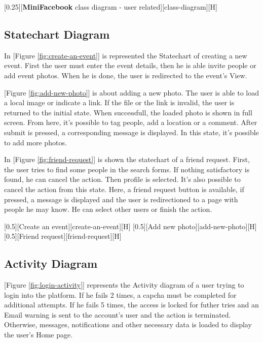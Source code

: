 \documentclass{article}
\begin{document}
			[0.25][\textbf{MiniFacebook} class diagram - user related][class-diagram][H]

		\subsection{Statechart Diagram}
			In [Figure \ref{fig:create-an-event}] is represented the Statechart of creating a new event. First the user must enter the event details, then he is able invite people or add event photos. When he is done, the user is redirected to the event's View.

			\bigskip
			[Figure \ref{fig:add-new-photo}] is about adding a new photo. The user is able to load a local image or indicate a link. If the file or the link is invalid, the user is returned to the initial state. When successfull, the loaded photo is shown in full screen. From here, it's possible to tag people, add a location or a comment. After submit is pressed, a corresponding message is displayed. In this state, it's possible to add more photos.
			
			\bigskip
			In [Figure \ref{fig:friend-request}] is shown the statechart of a friend request. First, the user tries to find some people in the search forms. If nothing satisfactory is found, he can cancel the action. Then profile is selected. It's also possible to cancel the action from this state. Here, a friend request button is available, if pressed, a message is displayed and the user is redirectioned to a page with people he may know. He can select other users or finish the action.

			[0.5][Create an event][create-an-event][H]
			[0.5][Add new photo][add-new-photo][H]
			[0.5][Friend request][friend-request][H]

		\subsection{Activity Diagram}
			[Figure \ref{fig:login-activity}] represents the Activity diagram of a user trying to login into the platform. If he fails 2 times, a capcha must be completed for additional attempts. If he fails 5 times, the access is locked for futher tries and an Email warning is sent to the account's user and the action is terminated. Otherwise, messages, notifications and other necessary data is loaded to display the user's Home page.
\end{document}
